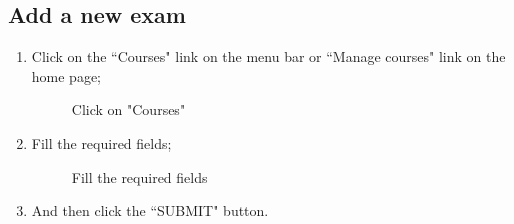 \documentclass[ManualeUtente]{subfiles}
\begin{document}
	\subsection{Add a new exam}
	\begin{enumerate}
		\item Click on the \textquotedblleft Courses" link on the menu bar or \textquotedblleft Manage courses" link on the home page;
		\begin{figure}[H]
			\centering
			\caption{Click on "Courses"}
			\label{fig:Click on "Courses"}
		\end{figure} \newpage
		\item Fill the required fields;
		\begin{figure}[H]
			\centering
			\caption{Fill the required fields}
			\label{fig:Fill the required fields}
		\end{figure}
		\item And then click the \textquotedblleft SUBMIT" button.

\end{enumerate}
\end{document}

